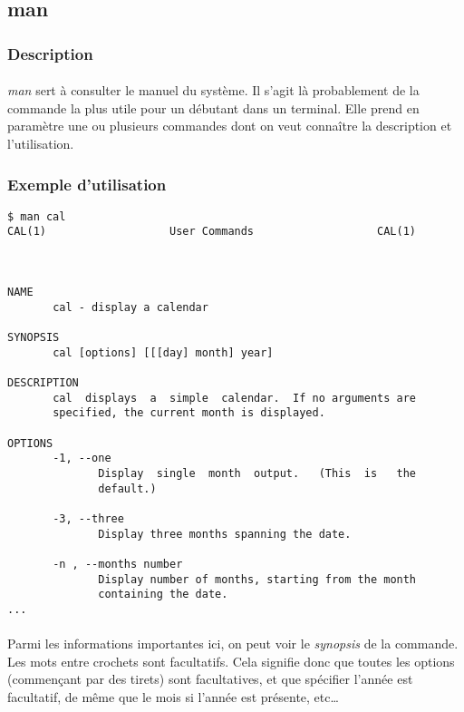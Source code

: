 \subsection{man}

\subsubsection*{Description}

\paragraph{} \emph{man} sert à consulter le manuel du système. Il s'agit là
probablement de la commande la plus utile pour un débutant dans un terminal.
Elle prend en paramètre une ou plusieurs commandes dont on veut connaître la
description et l'utilisation.

\subsubsection*{Exemple d'utilisation}

\begin{lstlisting}
$ man cal
CAL(1)                   User Commands                   CAL(1)



NAME
       cal - display a calendar

SYNOPSIS
       cal [options] [[[day] month] year]

DESCRIPTION
       cal  displays  a  simple  calendar.  If no arguments are
       specified, the current month is displayed.

OPTIONS
       -1, --one
              Display  single  month  output.   (This  is   the
              default.)

       -3, --three
              Display three months spanning the date.

       -n , --months number
              Display number of months, starting from the month
              containing the date.
...
\end{lstlisting}

\paragraph{} Parmi les informations importantes ici, on peut voir le
\emph{synopsis} de la commande. Les mots entre crochets sont facultatifs. Cela
signifie donc que toutes les options (commençant par des tirets) sont
facultatives, et que spécifier l'année est facultatif, de même que le mois si
l'année est présente, etc\ldots

